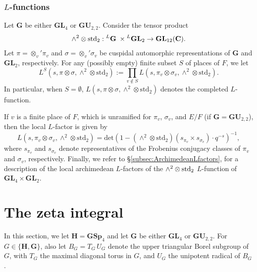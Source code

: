 \documentclass[11pt, reqno]{amsart}
\theoremstyle{plain}
\theoremstyle{definition}
\theoremstyle{remark}
\theoremstyle{plain}
\def\C{{\bf C}}
\def\H{{H}}
\def\G{\mathbf{G}}
\def\H{\mathbf{H}}
\def\GSp{{\mathbf{GSp}}}
\def\GU{{\mathbf{GU}}}
\def\GL{\mathbf{GL}}
\begin{document}
\subsubsection{$L$-functions}
Let $\G$ be either $\GL_4$ or $\GU_{2,2}$. Consider the tensor product 
    \[\wedge^2\otimes\mathrm{std}_2:{}^{L}\G \;\times {}^{L}\GL_2\to \GL_{12}(\C).\]
    Let $\pi = \otimes_v' \pi_v$ and $\sigma = \otimes_v' \sigma_v$ be cuspidal automorphic representations of $\G$ and $\GL_2$, respectively. For any (possibly empty) finite subset $S$ of places of $F$, we let $$L^S(s, \pi \otimes \sigma, \wedge^2\otimes\mathrm{std}_2) := \prod_{v \not \in S} L(s,\pi_v \otimes \sigma_v, \wedge^2\otimes\mathrm{std}_2).$$ In particular, when $S =\emptyset$,  $L(s, \pi \otimes \sigma, \wedge^2\otimes\mathrm{std}_2)$ denotes the completed $L$-function. 
    
    If $v$ is a finite place of $F$, which is unramified for $\pi_v$, $\sigma_v$, and $E/F$ (if $\G =\GU_{2,2}$), then the local $L$-factor is given by 
    $$ L(s,\pi_v\otimes\sigma_v,\wedge^2\otimes\mathrm{std}_2) = \mathrm{det}\left(1-(\wedge^2\otimes \mathrm{std}_2)(s_{\pi_v}\times s_{\sigma_v})\cdot q^{-s}\right)^{-1}\!\!\!\!\!\!\!,$$
    where $s_{\pi_v}$ and $s_{\sigma_v}$ denote representatives of the Frobenius conjugacy classes of $\pi_v$ and $\sigma_v$, respectively. Finally, we refer to \S \ref{subsec:ArchimedeanLfactors}, for a description of the local archimedean $L$-factors of the $\wedge^2 \otimes {\rm std}_2$ $L$-function of $\GL_4 \times \GL_2$. 


\section{The zeta integral} \label{sec:The_zeta_integral}

In this section, we let $\H = \GSp_4$ and let $\G$ be either $\GL_4$ or $\GU_{2,2}$. For $G \in \{\H,\G\}$, also let $B_G = T_G \,U_G$ denote the upper triangular Borel subgroup of $G$, with $T_G$ the maximal diagonal torus in $G$, and $U_G$ the unipotent radical of $B_G$. 
\end{document}
